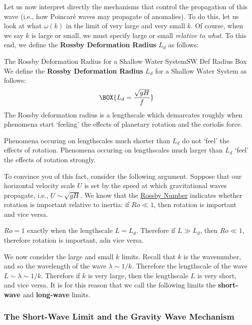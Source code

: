 Let us now interpret directly the mechanisms that control the propagation of this wave (i.e., how Poincaré waves may propagate of anomalies). To do this, let us look at what $\omega(k)$ in the limit of very large and very small $k$. Of course, when we say $k$ is large or small, we must specify large or small \textit{relative to what}. To this end, we define the \textbf{Rossby Deformation Radius} $L_d$ as follows:
\begin{fact}{The Rossby Deformation Radius for a Shallow Water System}{SW Def Radius Box}\label{SW Def Radius Box}
    We define the \textbf{Rossby Deformation Radius} $L_d$ for a Shallow Water System as follows:
    \begin{gather}
        \BOX{L_d = \frac{\sqrt{gH}}{f}}
    \end{gather}
    The Rossby deformation radius is a lengthscale which demarcates roughly when phenomena start `feeling' the effects of planetary rotation and the coriolis force. 

    Phenomena occuring on lengthscales much shorter than $L_d$ do not `feel' the effects of rotation. Phenomena occuring on lengthscales much larger than $L_d$ `feel' the effects of rotation strongly.
\end{fact}

To convince you of this fact, consider the following argument. Suppose that our horizontal velocity scale $U$ is set by the speed at which gravitational waves propagate, i.e., $U\sim\sqrt{gH}$. We know that the \hyperref[Rossby Box]{Rossby Number} indicates whether rotation is important relative to inertia: if $Ro\ll 1$, then rotation is important and vice versa.

$Ro=1$ exactly when the lengthscale $L=L_d$. Therefore if $L\gg L_d$, then $Ro\ll1$, therefore rotation is important, adn vice versa.

We now consider the large and small $k$ limits. Recall that $k$ is the wavenumber, and so the wavelength of the wave $\lambda\sim 1/k$. Therefore the lengthscale of the wave $L\sim\lambda\sim 1/k$. Therefore if $k$ is very large, then the lengthscale $L$ is very short, and vice versa. It is for this reason that we call the following limits the \textbf{short-wave} and \textbf{long-wave} limits.

\subsubsection{The Short-Wave Limit and the Gravity Wave Mechanism}

